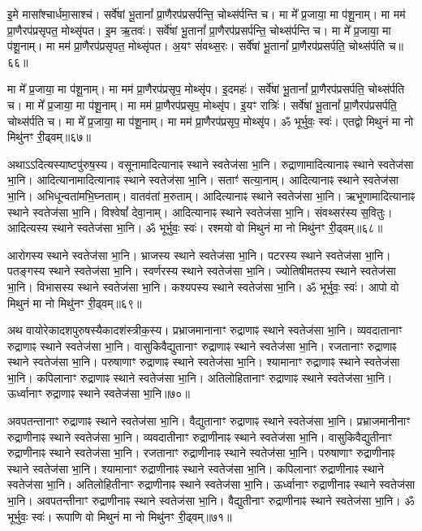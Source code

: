 इ॒मे मासा᳚श्चार्धमा॒साश्च॑। सर्वे॑षां भू॒तानां᳚ प्रा॒णैरप॑प्रसर्पन्ति॒ चोथ्स॑र्पन्ति च। 
मा मे᳚ प्र॒जाया॒ मा प॑शू॒नाम्। मा मम॑ प्रा॒णैरप॑प्रसृपत॒ मोथ्सृ॑पत। 
इ॒म ऋ॒तवः॑। सर्वे॑षां भू॒तानां᳚ प्रा॒णैरप॑प्रसर्पन्ति॒ चोथ्स॑र्पन्ति च। 
मा मे᳚ प्र॒जाया॒ मा प॑शू॒नाम्। मा मम॑ प्रा॒णैरप॑प्रसृपत॒ मोथ्सृ॑पत। 
अ॒यꣳ सं॑वथ्स॒रः। सर्वे॑षां भू॒तानां᳚ प्रा॒णैरप॑प्रसर्पति॒ चोथ्स॑र्पति च॥६६॥


मा मे᳚ प्र॒जाया॒ मा प॑शू॒नाम्। मा मम॑ प्रा॒णैरप॑प्रसृप॒ मोथ्सृ॑प। 
इ॒दमहः॑। सर्वे॑षां भू॒तानां᳚ प्रा॒णैरप॑प्रसर्पति॒ चोथ्स॑र्पति च। 
मा मे᳚ प्र॒जाया॒ मा प॑शू॒नाम्। मा मम॑ प्रा॒णैरप॑प्रसृप॒ मोथ्सृ॑प। 
इ॒यꣳ रात्रिः॑। सर्वे॑षां भू॒तानां᳚ प्रा॒णैरप॑प्रसर्पति॒ चोथ्स॑र्पति च। 
मा मे᳚ प्र॒जाया॒ मा प॑शू॒नाम्। मा मम॑ प्रा॒णैरप॑प्रसृप॒ मोथ्सृ॑प। 
ॐ भूर्भुवः॒ स्वः॑। एतद्वो मिथुनं मा नो मिथु॑नꣳ री॒ढ्वम्॥६७॥\anuvakamend


अथाऽऽदित्यस्याष्टपु॑रुष॒स्य। 
वसूनामादित्यानाꣴ स्थाने स्वतेज॑सा भा॒नि। 
रुद्राणामादित्यानाꣴ स्थाने स्वतेज॑सा भा॒नि। 
आदित्यानामादि\-त्यानाꣴ स्थाने स्वतेज॑सा भा॒नि। 
सताꣳ॑ सत्या॒नाम्। आदित्यानाꣴ स्थाने स्वतेज॑सा भा॒नि। 
अभिधून्वता॑\-मभि॒घ्नताम्। वातव॑तां म॒रुताम्। 
आदित्यानाꣴ स्थाने स्वतेज॑सा भा॒नि। 
ऋभूणामादित्यानाꣴ स्थाने स्वतेज॑सा भा॒नि। 
विश्वेषां᳚ देवा॒नाम्। आदित्यानाꣴ स्थाने स्वतेज॑सा भा॒नि। 
संवथ्सर॑स्य स॒वितुः। आदित्यस्य स्थाने स्वतेज॑सा भा॒नि। 
ॐ भूर्भुवः॒ स्वः॑। रश्मयो वो मिथुनं मा नो मिथु॑नꣳ री॒ढ्वम्॥६८॥\anuvakamend


आरोगस्य स्थाने स्वतेज॑सा भा॒नि। भ्राजस्य स्थाने स्वतेज॑सा भा॒नि। 
पटरस्य स्थाने स्वतेज॑सा भा॒नि। पतङ्गस्य स्थाने स्वतेज॑सा भा॒नि। 
स्वर्णरस्य स्थाने स्वतेज॑सा भा॒नि। ज्योतिषीमतस्य स्थाने स्वतेज॑सा भा॒नि। 
विभासस्य स्थाने स्वतेज॑सा भा॒नि। कश्यपस्य स्थाने स्वतेज॑सा भा॒नि। 
ॐ भूर्भुवः॒ स्वः॑। आपो वो मिथुनं मा नो मिथु॑नꣳ री॒ढ्वम्॥६९॥\anuvakamend


अथ वायोरेकादशपुरुषस्यैकादश॑स्त्रीक॒स्य। 
प्रभ्राजमानानाꣳ रुद्राणाꣴ स्थाने स्वतेज॑सा भा॒नि। 
व्यवदातानाꣳ रुद्राणाꣴ स्थाने स्वतेज॑सा भा॒नि। 
वासुकिवैद्युतानाꣳ रुद्राणाꣴ स्थाने स्वतेज॑सा भा॒नि। 
रजतानाꣳ रुद्राणाꣴ स्थाने स्वतेज॑सा भा॒नि। 
परुषाणाꣳ रुद्राणाꣴ स्थाने स्वतेज॑सा भा॒नि। 
श्यामानाꣳ रुद्राणाꣴ स्थाने स्वतेज॑सा भा॒नि। 
कपिलानाꣳ रुद्राणाꣴ स्थाने स्वतेज॑सा भा॒नि। 
अतिलोहितानाꣳ रुद्राणाꣴ स्थाने स्वतेज॑सा भा॒नि। 
ऊर्ध्वानाꣳ रुद्राणाꣴ स्थाने स्वतेज॑सा भा॒नि॥७०॥


अवपतन्तानाꣳ रुद्राणाꣴ स्थाने स्वतेज॑सा भा॒नि। 
वैद्युतानाꣳ रुद्राणाꣴ स्थाने स्वतेज॑सा भा॒नि। 
प्रभ्राजमानीनाꣳ रुद्राणीनाꣴ स्थाने स्वतेज॑सा भा॒नि। 
व्यवदातीनाꣳ रुद्राणीनाꣴ स्थाने स्वतेज॑सा भा॒नि। 
वासुकिवैद्युतीनाꣳ रुद्राणीनाꣴ स्थाने स्वतेज॑सा भा॒नि। 
रजतानाꣳ रुद्राणीनाꣴ स्थाने स्वतेज॑सा भा॒नि। 
परुषाणाꣳ रुद्राणीनाꣴ स्थाने स्वतेज॑सा भा॒नि। 
श्यामानाꣳ रुद्राणीनाꣴ स्थाने स्वतेज॑सा भा॒नि। 
कपिलानाꣳ रुद्राणीनाꣴ स्थाने स्वतेज॑सा भा॒नि। 
अतिलोहितीनाꣳ रुद्राणीनाꣴ स्थाने स्वतेज॑सा भा॒नि। 
ऊर्ध्वानाꣳ रुद्राणीनाꣴ स्थाने स्वतेज॑सा भा॒नि। 
अवपतन्तीनाꣳ रुद्राणीनाꣴ स्थाने स्वतेज॑सा भा॒नि। 
वैद्युतीनाꣳ रुद्राणीनाꣴ स्थाने स्वतेज॑सा भा॒नि। 
ॐ भूर्भुवः॒ स्वः॑। रूपाणि वो मिथुनं मा नो मिथु॑नꣳ री॒ढ्वम्॥७१॥\anuvakamend


